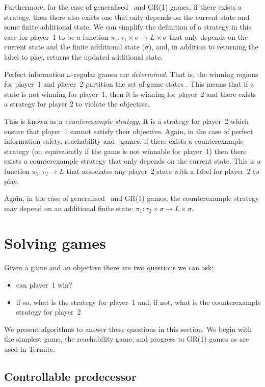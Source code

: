 Furthermore, for the case of generalised \buchi\ and GR(1) games, if there exists a strategy, then there also exists one that only depends on the current state and some finite additional state. We can simplify the definition of a strategy in this case for player~1 to be a function $\pi_1 : \tau_1 \times \sigma \rightarrow L \times \sigma$ that only depends on the current state and the finite additional state ($\sigma$), and, in addition to returning the label to play, returns the updated additional state.

Perfect information $\omega$-regular games are \emph{determined}. That is, the winning regions for player~1 and player~2 partition the set of game states \cite{Gradel}. This means that if a state is not winning for player~1, then it is winning for player~2 and there exists a strategy for player 2 to violate the objective.

This is known as a \emph{counterexample strategy}. It is a strategy for player~2 which ensure that player~1 cannot satisfy their objective. Again, in the case of perfect information safety, reachability and \buchi\ games, if there exists a counterexample strategy (or, equivalently if the game is not winnable for player~1) then there exists a counterexample strategy that only depends on the current state. This is a function $\pi_2 : \tau_2 \rightarrow L$ that associates any player~2 state with a label for player~2 to play. 

Again, in the case of generalised \buchi\ and GR(1) games, the counterexample strategy may depend on an additional finite state: $\pi_1 : \tau_2 \times \sigma \rightarrow L \times \sigma$.

\section{Solving games}

Given a game and an objective there are two questions we can ask:
\begin{itemize}
    \item can player~1 win?
    \item if so, what is the strategy for player~1 and, if not, what is the counterexample strategy for player~2
\end{itemize}

We present algorithms to answer these questions in this section. We begin with the simplest game, the reachability game, and progress to GR(1) games as are used in Termite.

\subsection{Controllable predecessor}


